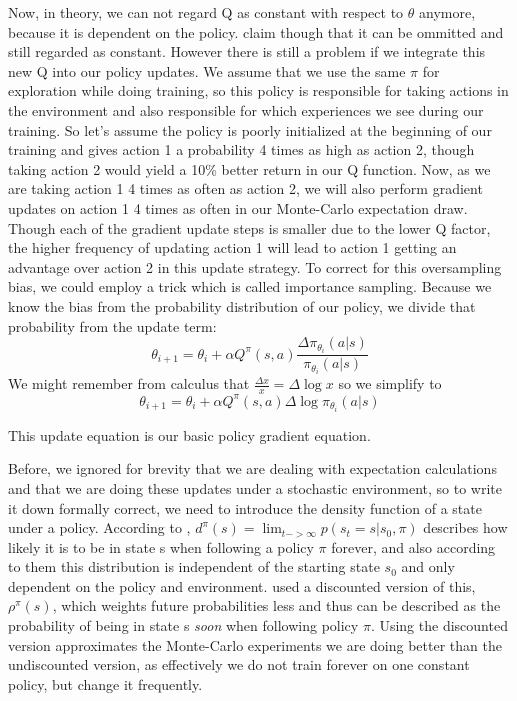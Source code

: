 \documentclass[hyperref,german,beleg]{cgvpub}
\begin{document}
Now, in theory, we can not regard Q as constant with respect to $\theta$ anymore, because it is dependent on the policy. \cite{suttonPolicyGradientMethods} claim though that it can be ommitted and still regarded as constant. However there is still a problem if we integrate this new Q into our policy updates. We assume that we use the same $\pi$ for exploration while doing training, so this policy is responsible for taking actions in the environment and also responsible for which experiences we see during our training. So let's assume the policy is poorly initialized at the beginning of our training and gives action 1 a probability 4 times as high as action 2, though taking action 2 would yield a 10\% better return in our Q function. Now, as we are taking action 1 4 times as often as action 2, we will also perform gradient updates on action 1 4 times as often in our Monte-Carlo expectation draw. Though each of the gradient update steps is smaller due to the lower Q factor, the higher frequency of updating action 1 will lead to action 1 getting an advantage over action 2 in this update strategy. To correct for this oversampling bias, we could employ a trick which is called importance sampling. Because we know the bias from the probability distribution of our policy, we divide that probability from the update term:
\begin{equation}
\theta_{i+1} = \theta_i + \alpha Q^{\pi}(s, a) \frac{ \Delta \pi_{\theta_i}(a|s)}{\pi_{\theta_i}(a|s)}
\end{equation}
We might remember from calculus that $\frac{\Delta x}{x} = \Delta \log x$ so we simplify to
\begin{equation}
\theta_{i+1} = \theta_i + \alpha Q^{\pi}(s, a) \Delta \log \pi_{\theta_i}(a|s)
\end{equation}

This update equation is our basic policy gradient equation.

Before, we ignored for brevity that we are dealing with expectation calculations and that we are doing these updates under a stochastic environment, so to write it down formally correct, we need to introduce the density function of a state under a policy. According to \cite{suttonPolicyGradientMethods}, $d^{\pi}(s) = \lim_{t -> \infty} p(s_t = s | s_0, \pi)$ describes how likely it is to be in state s when following a policy $\pi$ forever, and also according to them this distribution is independent of the starting state $s_0$ and only dependent on the policy and environment. \cite{silverDeterministicPolicyGradient2013} used a discounted version of this, $\rho^{\pi}(s)$, which weights future probabilities less and thus can be described as the probability of being in state s \textit{soon} when following policy $\pi$. Using the discounted version approximates the Monte-Carlo experiments we are doing better than the undiscounted version, as effectively we do not train forever on one constant policy, but change it frequently.
\end{document}
